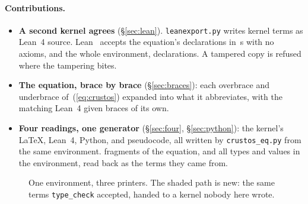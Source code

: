 \documentclass[11pt]{article}
\newcommand{\code}[1]{\texttt{#1}}
\begin{document}
\paragraph{Contributions.}
\begin{itemize}
\item \textbf{A second kernel agrees} (\S\ref{sec:lean}). \code{leanexport.py}
  writes kernel terms as Lean~4 source. Lean~\leanVersion{} accepts the
  equation's \leanDecls{} declarations in \leanSeconds\,s with no axioms, and
  the whole environment, \leanAllDecls{} declarations. A tampered copy is
  refused where the tampering bites.
\item \textbf{The equation, brace by brace} (\S\ref{sec:braces}): each
  overbrace and underbrace of~(\ref{eq:crustos}) expanded into what
  it abbreviates, with the matching Lean~4 given braces of its own.
\item \textbf{Four readings, one generator} (\S\ref{sec:four},
  \S\ref{sec:python}): the kernel's \LaTeX{}, Lean~4, Python, and
  pseudocode, all written by \code{crustos\_eq.py} from the same environment.
  \rtFragments{} fragments of the equation, and all \rtEnvTerms{} types and
  values in the environment, read back as the terms they came from.
\end{itemize}

\begin{figure}[h]
\centering
{}
\caption{One environment, three printers. The shaded path is new: the same
terms \code{type\_check} accepted, handed to a kernel nobody here wrote.}
\label{fig:pipeline}
\end{figure}
\end{document}
